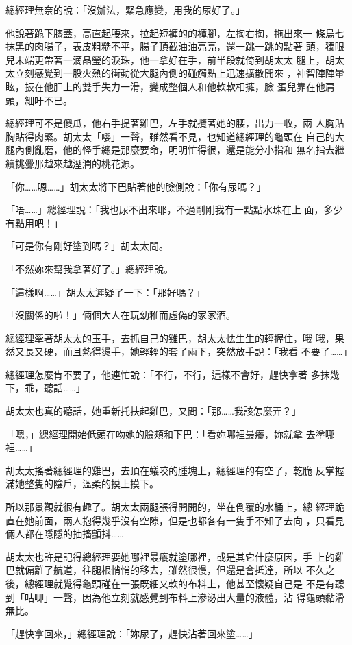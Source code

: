 總經理無奈的說：「沒辦法，緊急應變，用我的尿好了。」

他說著跪下膝蓋，高直起腰來，拉起短褲的的褲腳，左掏右掏，拖出來一
條烏七抹黑的肉腸子，表皮粗糙不平，腸子頂截油油亮亮，還一跳一跳的點著
頭，獨眼兒末端更帶著一滴晶瑩的淚珠，他一拿好在手，前半段就倚到胡太太
腿上，胡太太立刻感覺到一股火熱的衝動從大腿內側的碰觸點上迅速擴散開來
，神智陣陣暈眩，扳在他胛上的雙手失力一滑，變成整個人和他軟軟相擁，臉
蛋兒靠在他肩頭，細吁不已。

總經理可不是傻瓜，他右手提著雞巴，左手就攬著她的腰，出力一收，兩
人胸貼胸貼得肉緊。胡太太「嚶」一聲，雖然看不見，也知道總經理的龜頭在
自己的大腿內側亂磨，他的怪手總是那麼要命，明明忙得很，還是能分小指和
無名指去繼續挑釁那越來越溼潤的桃花源。

「你……嗯……」胡太太將下巴貼著他的臉側說：「你有尿嗎？」

「唔……」總經理說：「我也尿不出來耶，不過剛剛我有一點點水珠在上
面，多少有點用吧！」

「可是你有剛好塗到嗎？」胡太太問。

「不然妳來幫我拿著好了。」總經理說。

「這樣啊……」胡太太遲疑了一下：「那好嗎？」

「沒關係的啦！」倆個大人在玩幼稚而虛偽的家家酒。

總經理牽著胡太太的玉手，去抓自己的雞巴，胡太太怯生生的輕握住，哦
哦，果然又長又硬，而且熱得燙手，她輕輕的套了兩下，突然放手說：「我看
不要了……」

總經理怎麼肯不要了，他連忙說：「不行，不行，這樣不會好，趕快拿著
多抹幾下，乖，聽話……」

胡太太也真的聽話，她重新托扶起雞巴，又問：「那……我該怎麼弄？」

「嗯，」總經理開始低頭在吻她的臉頰和下巴：「看妳哪裡最癢，妳就拿
去塗哪裡……」

胡太太搖著總經理的雞巴，去頂在蟻咬的腫塊上，總經理的有空了，乾脆
反掌握滿她整隻的陰戶，溫柔的摸上摸下。

所以那景觀就很有趣了。胡太太兩腿張得開開的，坐在倒覆的水桶上，總
經理跪直在她前面，兩人抱得幾乎沒有空隙，但是也都各有一隻手不知了去向
，只看見倆人都在隱隱的抽搐顫抖……

胡太太也許是記得總經理要她哪裡最癢就塗哪裡，或是其它什麼原因，手
上的雞巴就偏離了航道，往腿根悄悄的移去，雖然很慢，但還是會抵達，所以
不久之後，總經理就覺得龜頭碰在一張既細又軟的布料上，他甚至懷疑自己是
不是有聽到「咕唧」一聲，因為他立刻就感覺到布料上滲泌出大量的液體，沾
得龜頭黏滑無比。

「趕快拿回來，」總經理說：「妳尿了，趕快沾著回來塗……」


